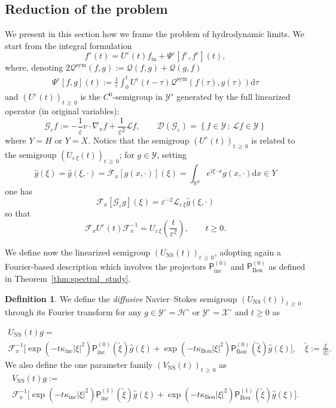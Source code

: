 \documentclass[10pt]{amsart}
\theoremstyle{definition}\newtheorem{defi}[theo]{Definition}\newtheorem{rema}[theo]{Remark}\newtheorem{exam}[theo]{Example}\newtheorem{exem}[theo]{Example}\newtheorem{nota}[theo]{Notation}
\newcommand{\ini}{\mathrm{in}}
\newcommand{\ns}{\mathrm{NS}}
\newcommand{\sym}{\mathrm{sym}}
\renewcommand{\d}{\mathrm{d}}
\newcommand{\Inc}{\mathrm{inc}}
\newcommand{\Bou}{\mathrm{Bou}}
\newcommand{\R}{\mathbb{R}}
\newcommand{\FF}{\mathcal{F}}
\newcommand{\XX}{\mathcal{X}}
\newcommand{\GG}{\mathcal{G}}
\newcommand{\HH}{\mathcal{H}}
\newcommand{\LL}{\mathcal{L}}
\newcommand{\PP}{\mathsf{P}}
\newcommand{\QQ}{\mathcal{Q}}
\newcommand{\VV}{\mathcal{Y}}
\newcommand{\dom}{\mathscr{D}}
\newcommand{\Ss}{H}
\newcommand{\SSsm}{\HH^{\circ}}
\newcommand{\Sl}{X}
\newcommand{\SSlm}{\XX^{\circ}}
\newcommand{\Sg}{Y}
\newcommand{\SSg}{\VV}
\newcommand{\SSgm}{\VV^{\circ}}
\renewcommand*\ge{\geqslant}
\renewcommand*\geq{\geqslant}
\newcommand*\eps{{\varepsilon}}
\begin{document}
\subsection{Reduction of the problem}\label{scn:reduction_problem}
We present in this section how we frame the problem of hydrodynamic limits. We start from the integral formulation
\begin{equation}\label{eq:Kin-Mild}
f^\eps(t) = U^\eps(t) f_\ini + \Psi^\eps\left[f^\eps, f^\eps \right](t),
\end{equation}
where, denoting $2 \QQ^\sym(f, g) := \QQ(f, g) + \QQ(g, f)$
\begin{gather*}
\Psi^\eps[f,g](t) := \frac{1}{\eps} \int_0^t U^\eps(t - \tau) \QQ^\sym (f(\tau), g(\tau)) \d \tau
\end{gather*}
and $(U^\eps(t))_{t\,\geq\,0}$ is the $C^0$-semigroup in $\SSg^s$ generated by the full linearized operator (in original variables):
\[
\GG_\eps f:=-\frac{1}{\eps} v\cdot \nabla_x f +\frac{1}{\eps^2}\LL f, \qquad \dom(\GG_\eps)=
\left\{f \in \SSg\,;\,\LL f \in \SSg\right\}
\]
where $\Sg=\Ss$ or $\Sg=\Sl.$ Notice that the semigroup $(U^\eps(t))_{t\,\geq\,0}$ is related to the semigroup $(U_{\eps\,\xi}(t))_{t\,\ge\,0}$; for $g \in \SSg$, setting
\[
\widehat{g}(\xi)=\widehat{g}(\xi,\cdot)=\FF_{x}\left[g(x,\cdot)\right](\xi)=\int_{\R^{d}}e^{i\xi\cdot x}g(x,\cdot)\d x \in \Sg
\]
one has
\[
\FF_x\left[\GG_\eps g\right](\xi) = \eps^{-2}\LL_{\eps\,\xi}\widehat{g}(\xi,\cdot)
\]
so that
\[
\FF_x U^\eps(t)\FF_x^{-1}=U_{\eps\,\xi}\left(\frac{t}{\eps^2}\right), \qquad t\ge0.
\]

We define now the linearized semigroup $(U_\ns(t))_{t\,\ge\,0}$, adopting again a Fourier-based description which involves the projectors $\PP^{(0)}_\Inc$ and $\PP_\Bou^{(0)}$ as defined in Theorem~\ref{thm:spectral_study}.


\begin{defi}\label{def:U_NS_V_NS}
We define the \emph{diffusive} Navier--Stokes semigroup $(U_\ns(t))_{t\,\geq\,0}$ through its Fourier transform for any $g \in \SSgm=\SSsm$ or $\SSgm=\SSlm$ and $t \ge 0$ as

\break
\begin{multline*}
U_\ns(t) g =\\
\FF_x^{-1} \Big[ \exp\left(- t \kappa_\Inc | \xi |^2\right) \PP^{(0)}_\Inc \left(\widetilde{\xi} \right) \widehat{g}(\xi) 
 + \exp\left(- t \kappa_\Bou | \xi |^2\right) \PP^{(0)}_\Bou \left(\widetilde{\xi} \right) \widehat{g}(\xi) \Big], \quad \widetilde{\xi} := \frac{\xi}{|\xi|}.
\end{multline*}
We also define the one parameter family $(V_\ns(t))_{t\,\ge \,0}$ as
\begin{multline}\label{eq:defi_V_ns}
V_\ns(t) g :=\\
\FF^{-1}_x\Big[\exp\left(- t \kappa_\Inc | \xi |^2\right) \PP^{(1)}_\Inc\left(\widetilde{\xi} \right) \widehat{g}(\xi) + \exp\left(- t \kappa_\Bou | \xi |^2\right) \PP^{(1)}_\Bou\left(\widetilde{\xi} \right) \widehat{g}(\xi) \Big].
\end{multline}
\end{defi}
\end{document}
